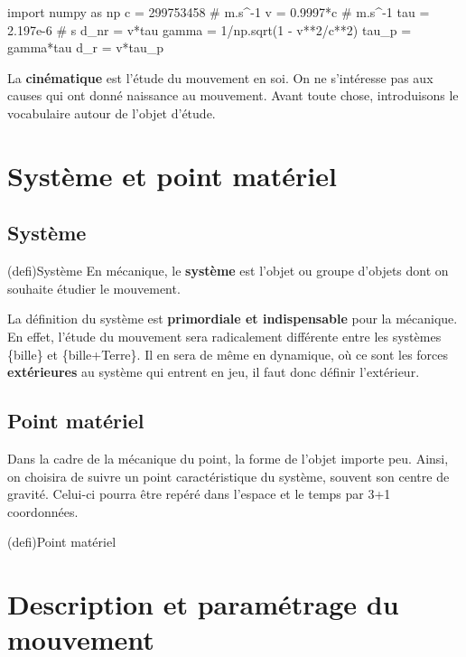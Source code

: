 \documentclass[../../main/main.tex]{subfiles}
\begin{document}
\begin{pycode}
	import numpy as np
	c = 299753458 # m.s^-1
	v = 0.9997*c  # m.s^-1
	tau = 2.197e-6 # s
	d_nr = v*tau
	gamma = 1/np.sqrt(1 - v**2/c**2)
	tau_p = gamma*tau
	d_r = v*tau_p
\end{pycode}

La \textbf{cinématique} est l'étude du mouvement en soi. On ne s'intéresse pas
aux causes qui ont donné naissance au mouvement. Avant toute chose, introduisons
le vocabulaire autour de l'objet d'étude.

\section{Système et point matériel}
\subsection{Système}
\begin{tcb*}(defi){Système}
	En mécanique, le \textbf{système} est l'objet ou groupe
	d'objets dont on souhaite étudier le mouvement.
\end{tcb*}

La définition du système est \textbf{primordiale et indispensable} pour la
mécanique. En effet, l'étude du mouvement sera radicalement différente entre les
systèmes \{bille\} et \{bille+Terre\}. Il en sera de même en dynamique, où ce
sont les forces \textbf{extérieures} au système qui entrent en jeu, il faut donc
définir l'extérieur.

\subsection{Point matériel}

Dans la cadre de la mécanique du point, la forme de l'objet importe peu. Ainsi,
on choisira de suivre un point caractéristique du système, souvent son centre de
gravité. Celui-ci pourra être repéré dans l'espace et le temps par 3+1
coordonnées.

\begin{tcb*}(defi){Point matériel}
\end{tcb*}

\section{Description et paramétrage du mouvement}
\end{document}
